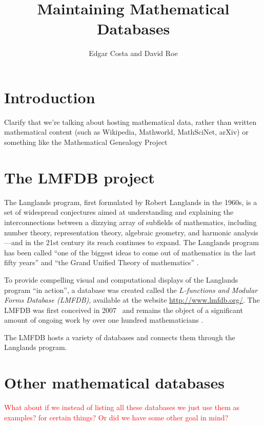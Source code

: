 \documentclass{article}
\title{Maintaining Mathematical Databases}
\author{Edgar Costa and David Roe}
\newcommand{\todo}[1]{\textcolor{red}{#1}}
\begin{document}
\maketitle

\section{Introduction}

Clarify that we're talking about hosting mathematical data, rather than written mathematical content (such as Wikipedia, Mathworld, MathSciNet, arXiv) or something like the Mathematical Genealogy Project

\section{The LMFDB project}
The Langlands program, first formulated by Robert Langlands in the 1960s, is a set of widespread conjectures aimed at understanding and explaining the interconnections between a dizzying array of subfields of mathematics, including number theory, representation theory, algebraic geometry, and harmonic analysis---and in the 21st century its reach continues to expand.
The Langlands program has been called ``one of the biggest ideas to come out of mathematics in the last fifty years'' and ``the Grand Unified Theory of mathematics'' \cite[p. 3]{frenkel}.


To provide compelling visual and computational displays of the Langlands program ``in action'', a database was created called the \emph{$L$-functions and Modular Forms Database (LMFDB)}, available at the website \url{http://www.lmfdb.org/}.
The LMFDB was first conceived in 2007~\cite{cremona-16} and remains the object of a significant amount of ongoing work by over one hundred mathematicians \cite[\S Acknowledgments]{lmfdb}.


The LMFDB hosts a variety of databases and connects them through the Langlands program.


\section{Other mathematical databases}

\todo{What about if we instead of listing all these databases we just use them as examples? for certain things? Or did we have some other goal in mind?}
\end{document}
